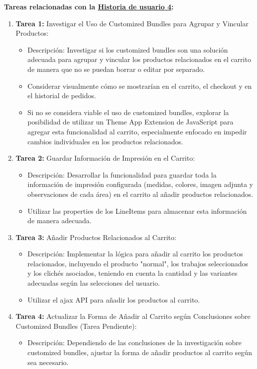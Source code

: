 \documentclass[12pt]{article}
\begin{document}
\textbf{Tareas relacionadas con la \hyperref[sec:historia4]{Historia de usuario 4}:}
\begin{enumerate}
    \item \textbf{Tarea 1:} Investigar el Uso de Customized Bundles para Agrupar y Vincular Productos:
          \begin{itemize}
              \item Descripción: Investigar si los customized bundles son una solución adecuada para agrupar y vincular los productos relacionados en el carrito de manera que no se puedan borrar o editar por separado.
              \item Considerar visualmente cómo se mostrarían en el carrito, el checkout y en el historial de pedidos.
              \item Si no se considera viable el uso de customized bundles, explorar la posibilidad de utilizar un Theme App Extension de JavaScript para agregar esta funcionalidad al carrito, especialmente enfocado en impedir cambios individuales en los productos relacionados.
          \end{itemize}
    \item \textbf{Tarea 2:} Guardar Información de Impresión en el Carrito:
          \begin{itemize}
              \item Descripción: Desarrollar la funcionalidad para guardar toda la información de impresión configurada (medidas, colores, imagen adjunta y observaciones de cada área) en el carrito al añadir productos relacionados.
              \item Utilizar las properties de los LineItems para almacenar esta información de manera adecuada.
          \end{itemize}
    \item \textbf{Tarea 3:} Añadir Productos Relacionados al Carrito:
          \begin{itemize}
              \item Descripción: Implementar la lógica para añadir al carrito los productos relacionados, incluyendo el producto "normal", los trabajos seleccionados y los clichés asociados, teniendo en cuenta la cantidad y las variantes adecuadas según las selecciones del usuario.
              \item Utilizar el ajax API para añadir los productos al carrito.
          \end{itemize}
    \item \textbf{Tarea 4:} Actualizar la Forma de Añadir al Carrito según Conclusiones sobre Customized Bundles (Tarea Pendiente):
          \begin{itemize}
              \item Descripción: Dependiendo de las conclusiones de la investigación sobre customized bundles, ajustar la forma de añadir productos al carrito según sea necesario.
          \end{itemize}
\end{enumerate}
\end{document}

